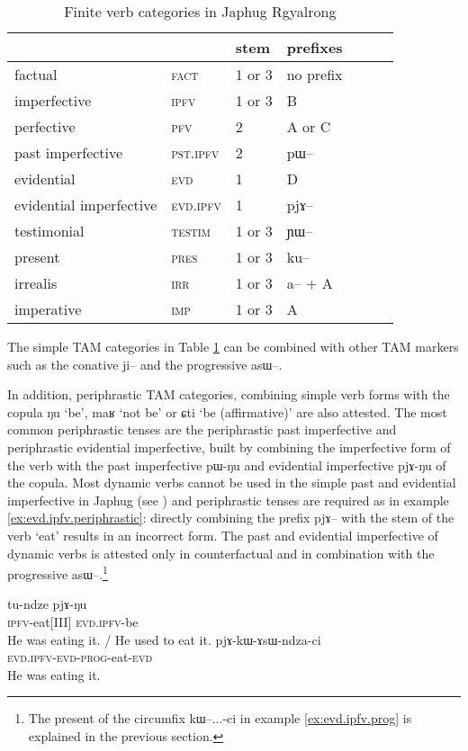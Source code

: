 \documentclass[oldfontcommands,oneside,a4paper,11pt]{article}
\newcommand{\ipa}[1]{{\phon #1}} %
\begin{document}
\begin{table}
\caption{Finite verb categories in Japhug Rgyalrong} \label{tab:finite.forms} \centering
\begin{tabular}{lllllll}
\toprule
&	&	stem&	prefixes\\
\midrule
factual&	\textsc{fact} &	1 or 3&	no prefix\\
imperfective&	\textsc{ipfv} &	1 or 3&	B\\
perfective&	\textsc{pfv} &	2&	A or C\\
past imperfective&	\textsc{pst.ipfv} &	2&	\ipa{pɯ--}\\
evidential&	\textsc{evd} &	1&	D\\
evidential imperfective&	\textsc{evd.ipfv} &	1&	\ipa{pjɤ--}\\
testimonial&	\textsc{testim} &	1 or 3&	\ipa{ɲɯ--}\\
present&	\textsc{pres} &	1 or 3&	\ipa{ku--}\\
irrealis&	\textsc{irr} &	1 or 3&	\ipa{a--} + A\\
imperative&	\textsc{imp} &	1 or 3&	A\\
\bottomrule
\end{tabular}
\end{table}

The simple TAM categories in Table \ref{tab:finite.forms} can be combined with other TAM markers such as the conative \ipa{ji--} and the progressive \ipa{asɯ--}. 

In addition, periphrastic TAM categories, combining simple verb forms with the copula \ipa{ŋu} `be', \ipa{maʁ} `not be' or \ipa{ɕti} `be (affirmative)' are also attested. The most common periphrastic tenses are the periphrastic past imperfective and periphrastic evidential imperfective, built by combining the imperfective form of the verb with the past imperfective \ipa{pɯ-ŋu} and evidential imperfective \ipa{pjɤ-ŋu} of the copula. Most dynamic verbs cannot be used in the simple past and evidential imperfective in Japhug (see \citealt{lin11direction}) and periphrastic tenses are required as in example \ref{ex:evd.ipfv.periphrastic}: directly combining the prefix \ipa{pjɤ--} with the stem of the verb `eat' results  in an incorrect form. The past and evidential imperfective of dynamic verbs is attested only in counterfactual and in combination with the progressive \ipa{asɯ--}.\footnote{The present of the circumfix \ipa{kɯ--...-ci} in example \ref{ex:evd.ipfv.prog} is explained in the previous section.}

\begin{exe}
\ex \label{ex:evd.ipfv.periphrastic}
\gll
\ipa{tu-ndze} \ipa{pjɤ-ŋu} \\
 \textsc{ipfv}-eat[III] \textsc{evd.ipfv}-be \\
\glt He was eating it. / He used to eat it.
\ex \label{ex:evd.ipfv.prog}
\gll
 \ipa{pjɤ-kɯ-ɤsɯ-ndza-ci} \\
 \textsc{evd.ipfv-evd-prog}-eat-\textsc{evd} \\
\glt He was eating it.
\end{exe}
\end{document}
